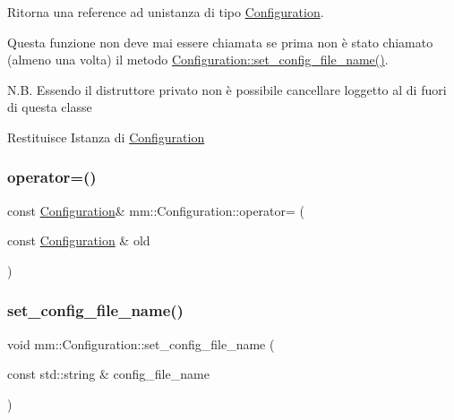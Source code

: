 Ritorna una reference ad un\textquotesingle{}istanza di tipo {\ttfamily \hyperlink{classmm_1_1_configuration}{Configuration}}. 

Questa funzione non deve mai essere chiamata se prima non è stato chiamato (almeno una volta) il metodo \hyperlink{classmm_1_1_configuration_ad526b28d1a7f8c6f854352b840d2d7b4}{Configuration\+::set\+\_\+config\+\_\+file\+\_\+name()}.

N.\+B. Essendo il distruttore privato non è possibile cancellare l\textquotesingle{}oggetto al di fuori di questa classe

\begin{DoxyReturn}{Restituisce}
Istanza di \hyperlink{classmm_1_1_configuration}{Configuration} 
\end{DoxyReturn}
\mbox{\label{classmm_1_1_configuration_a3077aebf459758dce4be716a8ddcb090}} 
\subsubsection{\texorpdfstring{operator=()}{operator=()}}
{\footnotesize\ttfamily const \hyperlink{classmm_1_1_configuration}{Configuration}\& mm\+::\+Configuration\+::operator= (\begin{DoxyParamCaption}\item[{const \hyperlink{classmm_1_1_configuration}{Configuration} \&}]{old }\end{DoxyParamCaption})\hspace{0.3cm}{\ttfamily [delete]}}

\mbox{\label{classmm_1_1_configuration_ad526b28d1a7f8c6f854352b840d2d7b4}} 
\subsubsection{\texorpdfstring{set\+\_\+config\+\_\+file\+\_\+name()}{set\_config\_file\_name()}}
{\footnotesize\ttfamily void mm\+::\+Configuration\+::set\+\_\+config\+\_\+file\+\_\+name (\begin{DoxyParamCaption}\item[{const std\+::string \&}]{config\+\_\+file\+\_\+name }\end{DoxyParamCaption})\hspace{0.3cm}{\ttfamily [static]}}



